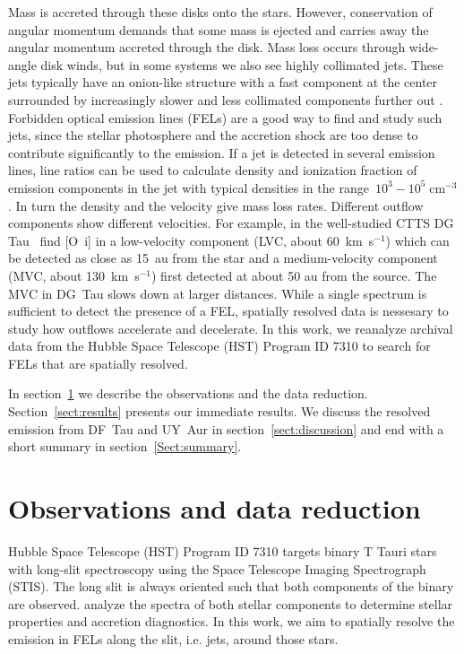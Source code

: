 \documentclass[twocolumn]{aastex62}
\begin{document}
Mass is accreted through these disks onto the stars. However,
conservation of angular momentum demands that some mass is ejected and
carries away the angular momentum accreted through
the disk. Mass
loss occurs through wide-angle disk winds, but in some systems we 
also see highly collimated jets. These jets typically have an onion-like
structure with a fast component at the center surrounded by increasingly
slower and less collimated components further
out \citep{2000ApJ...537L..49B}. Forbidden optical emission lines (FELs) are a
good way to find and study such jets, since the stellar photosphere and
the accretion shock are too dense to contribute significantly to the emission. If a
jet is detected in several emission lines, line ratios can be used to
calculate density and ionization fraction of emission components in the
jet with typical densities in the range~$10^3-10^5\;\mathrm{cm}^{-3}$
\citep[e.g.][]{1999A&A...342..717B,2000A&A...356L..41L,2013A&A...550L...1S}. In turn
the density and the velocity give mass loss rates. Different outflow
components show different velocities. For example, in the well-studied
CTTS DG Tau~\citet{2013A&A...550L...1S} find [O~{\sc i}] in a low-velocity
component (LVC, about 60~km~s$^{-1}$) which can be detected as
close as 15~au from the star and a medium-velocity component (MVC, about
130~km~s$^{-1}$) first detected at about 50 au from the source. The MVC in DG~Tau
slows down at larger distances. While a single spectrum is sufficient to
detect the presence of a FEL, spatially resolved data is nessesary to study
how outflows accelerate and decelerate. In this work, we reanalyze
archival data from the Hubble Space Telescope (HST) Program ID 7310 to
search for FELs that are spatially resolved.

In section~\ref{sect:obs} we describe the observations and the data reduction. Section~\ref{sect:results} presents our immediate results. We discuss the resolved emission from DF~Tau and UY~Aur in section~\ref{sect:discussion} and end with a short summary in section~\ref{Sect:summary}.

\section{Observations and data reduction}
\label{sect:obs}



Hubble Space Telescope (HST) Program ID 7310 targets binary T Tauri
stars with long-slit spectroscopy using the Space Telescope Imaging
Spectrograph (STIS). The long slit is always oriented such that both
components of the binary are observed. \citet{2003ApJ...583..334H} analyze the
spectra of both stellar components to determine stellar properties and
accretion diagnostics. In this work, we aim to spatially resolve the
emission in FELs along the slit, i.e. jets, around those stars.
\end{document}
